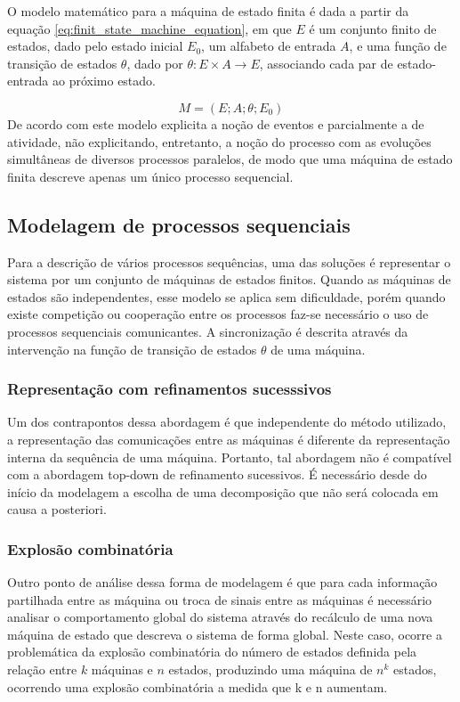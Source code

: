 O modelo matemático para a máquina de estado finita é dada a partir da equação \ref*{eq:finit_state_machine_equation}, em que $E$ é um conjunto finito de estados, dado pelo estado inicial $E_0$, um alfabeto de entrada $A$, e uma função de transição de estados $\theta$, dado por $\theta : E \times A \rightarrow E$, associando cada par de estado-entrada ao próximo estado.

\begin{equation}\label{eq:finit_state_machine_equation}
    M = (E; A; \theta; E_0)
\end{equation}
De acordo com \cite{vallete} este modelo explicita a noção de eventos e parcialmente a de atividade, não explicitando, entretanto, a noção do processo com as evoluções simultâneas de diversos processos paralelos, de modo que uma máquina de estado finita descreve apenas um único processo sequencial.

\subsection{Modelagem de processos sequenciais}
Para a descrição de vários processos sequências, uma das soluções é representar o sistema por um conjunto de máquinas de estados finitos. Quando as máquinas de estados são independentes, esse modelo se aplica sem dificuldade, porém quando existe competição ou cooperação entre os processos faz-se necessário o uso de processos sequenciais comunicantes. A sincronização é descrita através da intervenção na função de transição de estados $\theta$ de uma máquina.

\subsubsection{Representação com refinamentos sucesssivos}
Um dos contrapontos dessa abordagem é que independente do método utilizado, a representação das comunicações entre as máquinas é diferente da representação interna da sequência de uma máquina. Portanto, tal abordagem não é compatível com a abordagem top-down de refinamento sucessivos. É necessário desde do início da modelagem a escolha de uma decomposição que não será colocada em causa a posteriori. 

\subsubsection{Explosão combinatória}
Outro ponto de análise dessa forma de modelagem é que para cada informação partilhada entre as máquina ou troca de sinais entre as máquinas é necessário analisar o comportamento global do sistema através do recálculo de uma nova máquina de estado que descreva o sistema de forma global. Neste caso, ocorre a problemática da explosão combinatória do número de estados definida pela relação entre $k$ máquinas e $n$ estados, produzindo uma máquina de $n^k $ estados, ocorrendo uma explosão combinatória a medida que k e n aumentam.

